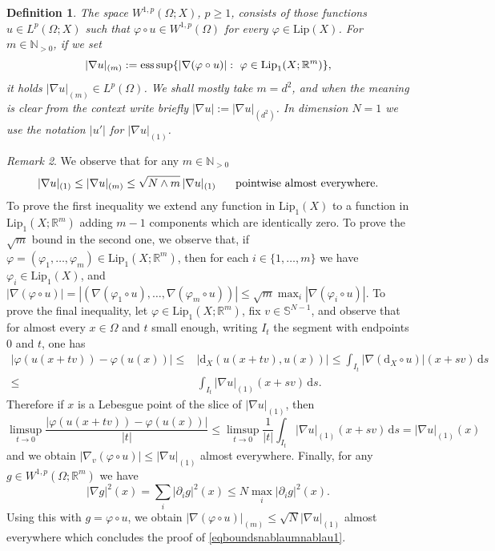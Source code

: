 \documentclass[a4paper,reqno]{amsart}
\newcommand\R{\mathbb{R}}
\newcommand\N{\mathbb{N}}
\newcommand{\dX}{\mathrm{d}_X}
\newtheorem{definition}{Definition}[section]
\theoremstyle{remark}
\newtheorem{remark}[definition]{Remark}
\newcommand\ds{{\,\mathrm{d}s}}
\newcommand{\Lip}{\mathrm{Lip}}
\numberwithin{equation}{section}
\begin{document}
\begin{definition} \label{def-sobolev-metric}
	The space $W^{1,p}(\Omega;X)$, $p\geq 1$, consists of those functions $u \in L^p(\Omega;X)$ such that
$\varphi\circ u \in W^{1,p}(\Omega)$ for every $\varphi\in \Lip(X)$.
For $m\in\N_{>0}$, if we set
\begin{equation}\label{f:ReshUG-m1}
		|\nabla u|_{(m)}:={\rm ess\, sup}\{|\nabla(\varphi\circ u)| : \   \varphi \in \Lip_1(X;\R^m) \},
	\end{equation}
	it holds $|\nabla u|_{(m)}\in L^p(\Omega)$.
We shall mostly take $m=d^2$, and when the meaning is clear from the context write briefly $|\nabla u|:=|\nabla u|_{(d^2)}$.
	In dimension $N=1$ we use the notation $|u'|$ for $|\nabla u|_{(1)}$.
\end{definition}

\begin{remark}
\label{rem-dep-m}
We observe that  for any $m\in\N_{>0}$
\begin{equation}\label{eqboundsnablaumnablau1}
 |\nabla u|_{(1)}\le
 |\nabla u|_{(m)}\le
 \sqrt {N\wedge m}\, |\nabla u|_{(1)} \hskip5mm\text{ pointwise almost everywhere.}
\end{equation}
To prove the first inequality we extend any function in $\Lip_1(X)$ to a function in $\Lip_1(X;\R^m)$ adding $m-1$ components which are identically zero. To prove the $\sqrt m$ bound in the second one, we
observe that, if $\varphi=(\varphi_1,\ldots,\varphi_m)\in \Lip_1(X;\R^m)$, then for each $i\in\{1,\dots, m\}$ we have
$\varphi_i\in \Lip_1(X)$, 
and $|\nabla (\varphi\circ u)|=|(\nabla (\varphi_1\circ u), \dots, \nabla(\varphi_m\circ u))|
\le \sqrt m \max_i |\nabla (\varphi_i\circ u)|$.
To prove the final inequality,
let $\varphi\in \Lip_1(X;\R^m)$, fix $v\in \mathbb{S}^{N-1}$, and observe that
for almost every $x\in\Omega$ and $t$ small enough, writing $I_t$ the segment with endpoints $0$ and $t$, one has
\begin{equation}
\begin{split}
 |\varphi(u(x+tv))-\varphi(u(x))|
 \le & |\dX(u(x+tv), u(x))|
 \le \int_{I_t} |\nabla (\dX\circ u)|(x+sv) \ds\\
 \le& \int_{I_t} |\nabla u|_{(1)}(x+sv)\ds.
\end{split}\end{equation}
Therefore if $x$ is a Lebesgue point of  the slice of $|\nabla u|_{(1)}$,
then
\begin{equation}
\limsup_{t\to0} \frac{|\varphi(u(x+tv))-\varphi(u(x))|}{|t|}
\le \limsup_{t\to0} \frac{1}{|t|}
\int_{I_t} |\nabla u|_{(1)}(x+sv)\ds
= |\nabla u|_{(1)}(x)
\end{equation}
and we obtain $|\nabla_v (\varphi\circ u)|\le |\nabla u|_{(1)}$ almost everywhere.
Finally, for any $g\in W^{1,p}(\Omega;\R^m)$ we have
\begin{equation}
 |\nabla g|^2(x)
 =\sum_i |\partial_i g|^2(x)
 \le N \max_i |\partial_i g|^2(x).
\end{equation}
Using this with $g=\varphi\circ u$,
we obtain
$|\nabla (\varphi\circ u)|_{(m)}\le \sqrt N |\nabla u|_{(1)}$ almost everywhere which concludes the proof of \eqref{eqboundsnablaumnablau1}.


\end{remark}
\end{document}
